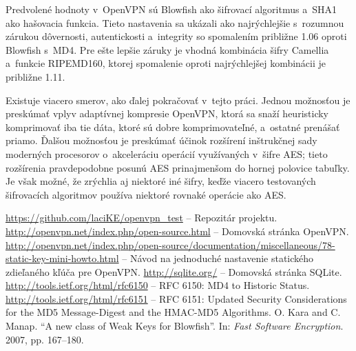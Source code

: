\documentclass[12pt,a4paper]{article}
\begin{document}
Predvolené hodnoty v~OpenVPN sú Blowfish ako šifrovací algoritmus a~SHA1
ako hašovacia funkcia. Tieto nastavenia sa ukázali ako najrýchlejšie
s~rozumnou zárukou dôvernosti, autentickosti a~integrity so spomalením
približne 1.06 oproti Blowfish s~MD4. Pre ešte lepšie
záruky je vhodná kombinácia šifry Camellia a~funkcie RIPEMD160, ktorej
spomalenie oproti najrýchlejšej kombinácii je približne 1.11.

Existuje viacero smerov, ako ďalej pokračovať v~tejto práci. Jednou
možnosťou je pre\-skú\-mať vplyv adaptívnej kompresie OpenVPN, ktorá sa snaží
heuristicky komprimovať iba tie dáta, ktoré sú dobre komprimovateľné,
a~ostatné prenášať priamo. Ďalšou možnosťou je preskúmať účinok rozšírení
inštrukčnej sady moderných procesorov o~akceleráciu operácií využívaných
v~šifre AES; tieto rozšírenia pravdepodobne posunú AES prinajmenšom do
hornej polovice tabuľky. Je však možné, že zrýchlia aj niektoré iné šifry,
keďže viacero testovaných šifrovacích algoritmov používa niektoré rovnaké
operácie ako AES.

\renewcommand{\refname}{Literatúra}
{}
\begin{thebibliography}{99}
   \url{https://github.com/laciKE/openvpn_test} -- Repozitár projektu.
   \url{http://openvpn.net/index.php/open-source.html} -- Domovská stránka OpenVPN.
   \url{http://openvpn.net/index.php/open-source/documentation/miscellaneous/78-static-key-mini-howto.html} -- Návod na jednoduché nastavenie statického zdieľaného kľúča pre OpenVPN.
   \url{http://sqlite.org/} -- Domovská stránka SQLite.
   \url{http://tools.ietf.org/html/rfc6150} -- RFC 6150: MD4 to Historic Status.
   \url{http://tools.ietf.org/html/rfc6151} -- RFC 6151: Updated Security Considerations for the MD5 Message-Digest and the HMAC-MD5 Algorithms.
   O. Kara and C. Manap. ``A new class of Weak Keys for Blowfish''. In: \emph{Fast Software Encryption}. 2007, pp. 167--180.
\end{thebibliography}
\end{document}

